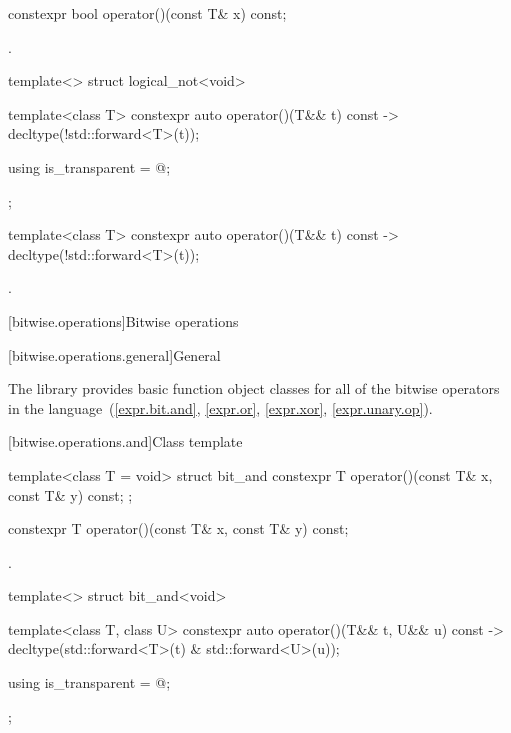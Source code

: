 %
\begin{itemdecl}
constexpr bool operator()(const T& x) const;
\end{itemdecl}

\begin{itemdescr}
\pnum
\returns
{}.
\end{itemdescr}

%
\begin{itemdecl}
template<> struct logical_not<void> {
  template<class T> constexpr auto operator()(T&& t) const
    -> decltype(!std::forward<T>(t));

  using is_transparent = @\unspec@;
};
\end{itemdecl}

%
\begin{itemdecl}
template<class T> constexpr auto operator()(T&& t) const
    -> decltype(!std::forward<T>(t));
\end{itemdecl}

\begin{itemdescr}
\pnum
\returns
{}.
\end{itemdescr}


[bitwise.operations]{Bitwise operations}

[bitwise.operations.general]{General}

\pnum
The library provides basic function object classes for all of the bitwise
operators in the language~(\ref{expr.bit.and}, \ref{expr.or},
\ref{expr.xor}, \ref{expr.unary.op}).

[bitwise.operations.and]{Class template }

%
\begin{itemdecl}
template<class T = void> struct bit_and {
  constexpr T operator()(const T& x, const T& y) const;
};
\end{itemdecl}

%
\begin{itemdecl}
constexpr T operator()(const T& x, const T& y) const;
\end{itemdecl}

\begin{itemdescr}
\pnum
\returns
{}.
\end{itemdescr}

%
\begin{itemdecl}
template<> struct bit_and<void> {
  template<class T, class U> constexpr auto operator()(T&& t, U&& u) const
    -> decltype(std::forward<T>(t) & std::forward<U>(u));

  using is_transparent = @\unspec@;
};
\end{itemdecl}

